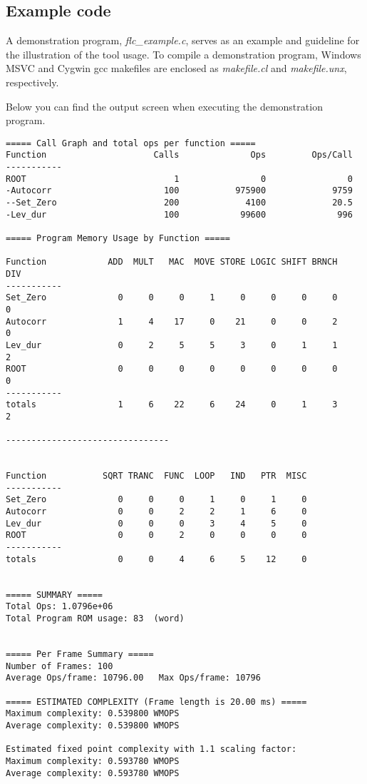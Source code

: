 \subsection{Example code}
A demonstration program, \textit{flc\_example.c}, serves as an example
and guideline for the illustration of the tool usage. To compile a
demonstration program, Windows MSVC and Cygwin gcc makefiles are
enclosed as \textit{makefile.cl} and \textit{makefile.unx},
respectively.

Below you can find the output screen when executing the demonstration program.
\begin{verbatim}
===== Call Graph and total ops per function =====
Function                     Calls              Ops         Ops/Call
-----------
ROOT                             1                0                0
-Autocorr                      100           975900             9759
--Set_Zero                     200             4100             20.5
-Lev_dur                       100            99600              996

===== Program Memory Usage by Function =====

Function            ADD  MULT   MAC  MOVE STORE LOGIC SHIFT BRNCH   DIV
-----------
Set_Zero              0     0     0     1     0     0     0     0     0
Autocorr              1     4    17     0    21     0     0     2     0
Lev_dur               0     2     5     5     3     0     1     1     2
ROOT                  0     0     0     0     0     0     0     0     0
-----------
totals                1     6    22     6    24     0     1     3     2

--------------------------------


Function           SQRT TRANC  FUNC  LOOP   IND   PTR  MISC
-----------
Set_Zero              0     0     0     1     0     1     0
Autocorr              0     0     2     2     1     6     0
Lev_dur               0     0     0     3     4     5     0
ROOT                  0     0     2     0     0     0     0
-----------
totals                0     0     4     6     5    12     0


===== SUMMARY =====
Total Ops: 1.0796e+06
Total Program ROM usage: 83  (word)


===== Per Frame Summary =====
Number of Frames: 100
Average Ops/frame: 10796.00   Max Ops/frame: 10796

===== ESTIMATED COMPLEXITY (Frame length is 20.00 ms) =====
Maximum complexity: 0.539800 WMOPS
Average complexity: 0.539800 WMOPS

Estimated fixed point complexity with 1.1 scaling factor:
Maximum complexity: 0.593780 WMOPS
Average complexity: 0.593780 WMOPS

\end{verbatim}

